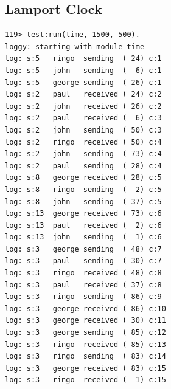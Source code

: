 \documentclass[a4paper, 11pt]{article}
\begin{document}
\subsection{Lamport Clock}
\begin{verbatim}
119> test:run(time, 1500, 500).
loggy: starting with module time
log: s:5   ringo  sending  ( 24) c:1
log: s:5   john   sending  (  6) c:1
log: s:5   george sending  ( 26) c:1
log: s:2   paul   received ( 24) c:2
log: s:2   john   received ( 26) c:2
log: s:2   paul   received (  6) c:3
log: s:2   john   sending  ( 50) c:3
log: s:2   ringo  received ( 50) c:4
log: s:2   john   sending  ( 73) c:4
log: s:2   paul   sending  ( 28) c:4
log: s:8   george received ( 28) c:5
log: s:8   ringo  sending  (  2) c:5
log: s:8   john   sending  ( 37) c:5
log: s:13  george received ( 73) c:6
log: s:13  paul   received (  2) c:6
log: s:13  john   sending  (  1) c:6
log: s:3   george sending  ( 48) c:7
log: s:3   paul   sending  ( 30) c:7
log: s:3   ringo  received ( 48) c:8
log: s:3   paul   received ( 37) c:8
log: s:3   ringo  sending  ( 86) c:9
log: s:3   george received ( 86) c:10
log: s:3   george received ( 30) c:11
log: s:3   george sending  ( 85) c:12
log: s:3   ringo  received ( 85) c:13
log: s:3   ringo  sending  ( 83) c:14
log: s:3   george received ( 83) c:15
log: s:3   ringo  received (  1) c:15
\end{verbatim}
\end{document}
